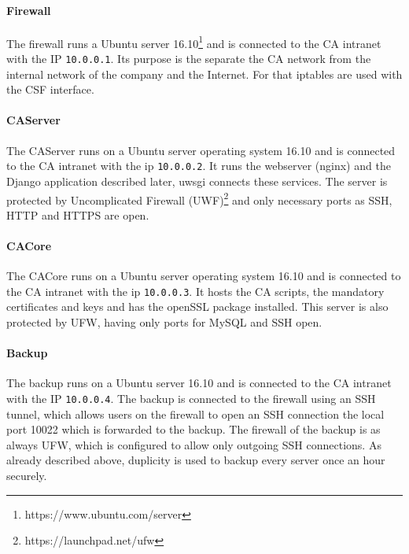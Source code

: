 \documentclass[english]{article}
\begin{document}


\paragraph{Firewall}

The firewall runs %
a Ubuntu server 16.10\footnote{https://www.ubuntu.com/server} and is connected to the CA intranet with the IP \texttt{10.0.0.1}. Its purpose is the separate the CA network from the internal network of the company and the Internet. For that iptables are used with the CSF interface.

\paragraph{CAServer}

The CAServer runs on %
a Ubuntu server operating system 16.10 and is connected to the CA intranet with the ip \texttt{10.0.0.2}. It runs the webserver (nginx) and the Django application described later, uwsgi connects these services. The server is protected by Uncomplicated Firewall (UWF)\footnote{https://launchpad.net/ufw} and only necessary ports as SSH, HTTP and HTTPS are open.

\paragraph{CACore}

The CACore runs on %
a Ubuntu server operating system 16.10 and is connected to the CA intranet with the ip \texttt{10.0.0.3}. It hosts the CA scripts, the mandatory certificates and keys and has the openSSL package installed. This server is also protected by UFW, having only ports for MySQL and SSH open.

\paragraph{Backup}

The backup runs on %
a Ubuntu server 16.10 and is connected to the CA intranet with the IP \texttt{10.0.0.4}. The backup is connected to the firewall using an SSH tunnel, which allows users on the firewall to open an SSH connection the local port 10022 which is forwarded to the backup. The firewall of the backup is as always UFW, which is configured to allow only outgoing SSH connections. As already described above, duplicity is used to backup every server once an hour securely.
\end{document}
